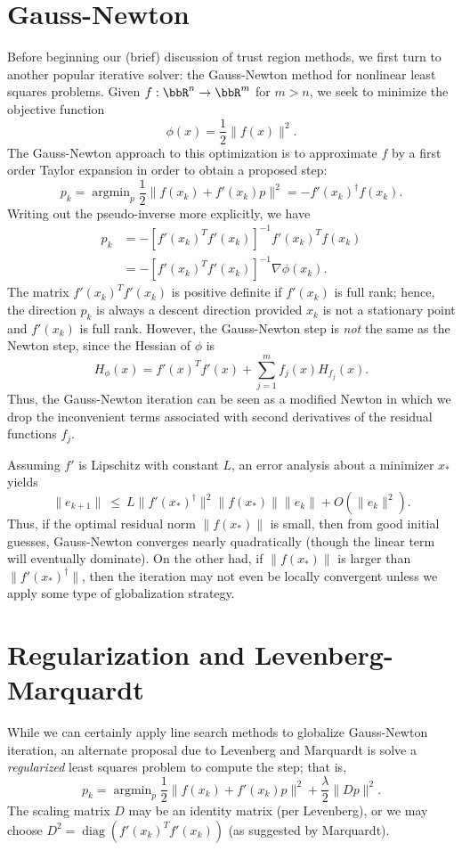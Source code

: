 \documentclass[12pt, leqno]{article} %
\begin{document}

\section{Gauss-Newton}

Before beginning our (brief) discussion of trust region methods,
we first turn to another popular iterative solver: the Gauss-Newton
method for nonlinear least squares problems.  Given
$f : \bbR^n \rightarrow \bbR^m$ for $m > n$, we seek to minimize
the objective function
\[
  \phi(x) = \frac{1}{2} \|f(x)\|^2.
\]
The Gauss-Newton approach to this optimization is to approximate
$f$ by a first order Taylor expansion in order to obtain a proposed
step:
\[
  p_k
    = \operatorname{argmin}_p \frac{1}{2} \|f(x_k) + f'(x_k) p\|^2
    = -f'(x_k)^\dagger f(x_k).
\]
Writing out the pseudo-inverse more explicitly, we have
\begin{align*}
  p_k
  &= -[f'(x_k)^T f'(x_k)]^{-1} f'(x_k)^T f(x_k) \\
  &= -[f'(x_k)^T f'(x_k)]^{-1} \nabla \phi(x_k).
\end{align*}
The matrix $f'(x_k)^T f'(x_k)$ is positive definite if $f'(x_k)$ is
full rank; hence, the direction $p_k$ is always a descent direction
provided $x_k$ is not a stationary point and $f'(x_k)$ is full rank.
However, the Gauss-Newton step is {\em not} the same as the Newton
step, since the Hessian of $\phi$ is
\[
  H_{\phi}(x) = f'(x)^T f'(x) + \sum_{j=1}^m f_j(x) H_{f_j}(x).
\]
Thus, the Gauss-Newton iteration can be seen as a modified Newton
in which we drop the inconvenient terms associated with second
derivatives of the residual functions $f_j$.

Assuming $f'$ is Lipschitz with constant $L$, an error analysis about a
minimizer $x_*$ yields
\[
  \|e_{k+1}\| ~ \leq ~ L \|f'(x_*)^\dagger\|^2 \|f(x_*)\| \|e_k\| + O(\|e_k\|^2).
\]
Thus, if the optimal residual norm $\|f(x_*)\|$ is small, then from
good initial guesses, Gauss-Newton converges nearly quadratically
(though the linear term will eventually dominate).  On the other had,
if $\|f(x_*)\|$ is larger than $\|f'(x_*)^\dagger\|$, then the
iteration may not even be locally convergent unless we apply some type
of globalization strategy.

\section{Regularization and Levenberg-Marquardt}

While we can certainly apply line search methods to globalize
Gauss-Newton iteration, an alternate proposal due to Levenberg and
Marquardt is solve a {\em regularized} least squares problem to
compute the step; that is,
\[
p_k =
\operatorname{argmin}_p
  \frac{1}{2} \|f(x_k) + f'(x_k) p\|^2 +
  \frac{\lambda}{2} \|Dp\|^2.
\]
The scaling matrix $D$ may be an identity matrix (per Levenberg),
or we may choose $D^2 = \operatorname{diag}(f'(x_k)^T f'(x_k))$
(as suggested by Marquardt).
\end{document}
